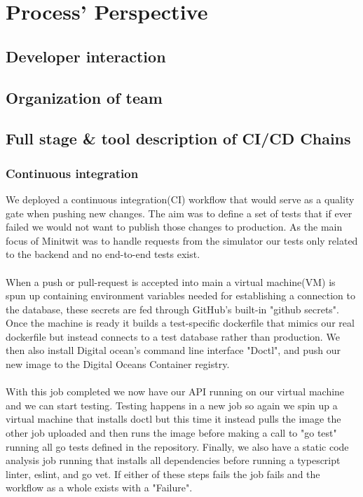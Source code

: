 \section{Process' Perspective}
\subsection{Developer interaction}
\subsection{Organization of team}
\subsection{Full stage \& tool description of CI/CD Chains}
\subsubsection{Continuous integration}
We deployed a continuous integration(CI) workflow\cite{DevOps-CI-CDont} that would serve as a quality gate when pushing new changes. The aim was to define a set of tests that if ever failed we would not want to publish those changes to production. As the main focus of Minitwit was to handle requests from the simulator our tests only related to the backend and no end-to-end tests exist.\\\\
When a push or pull-request is accepted into main a virtual machine(VM) is spun up containing environment variables needed for establishing a connection to the database, these secrets are fed through GitHub's built-in "github secrets"\cite{GitHub-Secrets}. Once the machine is ready it builds a test-specific dockerfile that mimics our real dockerfile but instead connects to a test database rather than production. We then also install Digital ocean's command line interface "Doctl"\cite{DigitalOcean-doctl}, and push our new image to the Digital Oceans Container registry.\\\\
With this job completed we now have our API running on our virtual machine and we can start testing. Testing happens in a new job so again we spin up a virtual machine that installs doctl but this time it instead pulls the image the other job uploaded and then runs the image before making a call to "go test" running all go tests defined in the repository. Finally, we also have a static code analysis job running that installs all dependencies before running a typescript linter, eslint, and go vet. If either of these steps fails the job fails and the workflow as a whole exists with a "Failure". 
